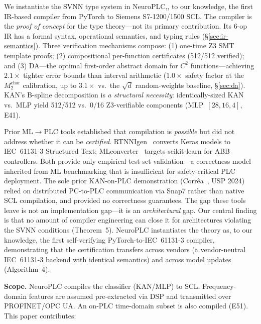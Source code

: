 \documentclass[journal,onecolumn]{IEEEtran}
\newcommand{\neuroplc}{NeuroPLC\xspace}
\begin{document}
We instantiate the SVNN type system in \neuroplc,, to our knowledge, the first IR-based
compiler from PyTorch to Siemens S7-1200/1500 SCL. The compiler is the
\textit{proof of concept} for the type theory---not its primary
contribution. Its 6-op IR has a formal syntax, operational semantics, and
typing rules ({\S}\ref{sec:ir-semantics}). Three verification mechanisms
compose: (1) one-time Z3 SMT template proofs; (2) compositional per-function
certificates (512/512 verified); and (3) DA---the optimal first-order
abstract domain for $C^2$ functions---achieving $2.1\times$ tighter
error bounds than interval arithmetic ($1.0\times$ safety factor at
the $M_2^{\text{char}}$ calibration, up to $3.1\times$ vs.\ the
$\sqrt{d}$ random-weights baseline, {\S}\ref{sec:da}). KAN's B-spline decomposition is \textit{a structural
necessity}: identically-sized KAN vs.\ MLP yield 512/512 vs.\ 0/16
Z3-verifiable components (MLP~$[28,16,4]$, E41).

Prior ML$\to$PLC tools established that compilation is \textit{possible} but
did not address whether it can be \textit{certified}. RTNNIgen~\cite{rtnnigen2024}
converts Keras models to IEC~61131-3 Structured Text; MLconverter~\cite{mlconverter2025}
targets scikit-learn for ABB controllers. Both provide only empirical test-set
validation---a correctness model inherited from ML benchmarking that is
insufficient for safety-critical PLC deployment. The sole prior KAN-on-PLC
demonstration (Corr\^ea~\cite{correa2024kanplc}, USP 2024) relied on distributed
PC-to-PLC communication via Snap7 rather than native SCL compilation, and
provided no correctness guarantees. The gap these tools leave is not an
implementation gap---it is an \textit{architectural} gap. Our central finding
is that no amount of compiler engineering can close it for architectures
violating the SVNN conditions (Theorem~5). \neuroplc instantiates the
theory as, to our knowledge, the first self-verifying PyTorch-to-IEC~61131-3 compiler,
demonstrating that the certification transfers across vendors (a
vendor-neutral IEC~61131-3 backend with identical semantics) and across
model updates (Algorithm~4).

\textbf{Scope.} \neuroplc compiles the classifier (KAN/MLP) to SCL.
Frequency-domain features are assumed pre-extracted via DSP and transmitted
over PROFINET/OPC UA. An on-PLC time-domain subset is also compiled
(E51). This paper contributes:
\end{document}
